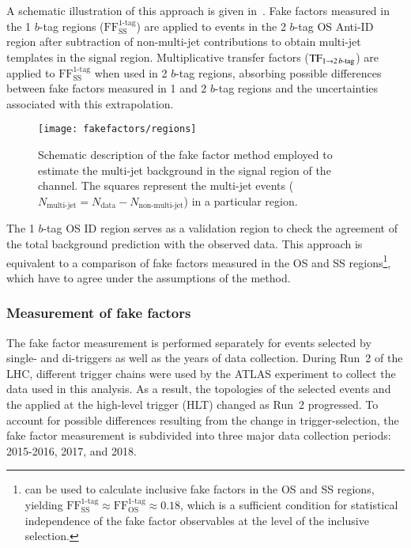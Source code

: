 A schematic illustration of this approach is given
in~. Fake factors measured in the 1
$b$-tag regions ($\text{FF}_\text{SS}^\text{1-tag}$) are applied to
events in the 2 $b$-tag OS Anti-ID region after subtraction of
non-multi-jet contributions to obtain multi-jet templates in the
signal region. Multiplicative transfer factors
($\text{TF}_{1 \rightarrow 2\,b\text{-tag}}$) are applied to
$\text{FF}_\text{SS}^\text{1-tag}$ when used in 2 $b$-tag regions,
absorbing possible differences between fake factors measured in 1 and
2 $b$-tag regions and the uncertainties associated with this
extrapolation.

\begin{figure}[htbp]
  \centering

  \texttt{[image: fakefactors/regions]}

  \caption{Schematic description of the fake factor method employed to
    estimate the multi-jet background in the signal region of the
    \hadhad channel. The squares represent the multi-jet events
    ($N_\text{multi-jet} = N_\text{data} - N_\text{non-multi-jet}$) in
    a particular region.}
  \label{fig:fakefactor_regions}
\end{figure}

The 1 $b$-tag OS ID region serves as a validation region to check the
agreement of the total background prediction with the observed data.
This approach is equivalent to a comparison of fake factors measured in the OS
and SS regions\footnote{ can be used to
  calculate inclusive fake factors in the OS and SS regions, yielding
  $\text{FF}_\text{SS}^\text{1-tag} \approx
  \text{FF}_\text{OS}^\text{1-tag} \approx 0.18$, which is a
  sufficient condition for statistical independence of the fake factor
  observables at the level of the inclusive selection.}, which have to
agree under the assumptions of the method.


\subsubsection{Measurement of fake factors}

The fake factor measurement is performed separately for events
selected by single- and di-\tauhadvis triggers as well as the years of
data collection. During Run~2 of the LHC, different \tauhadvis trigger
chains were used by the ATLAS experiment to collect the data used in
this analysis. As a result, the topologies of the selected events and
the \tauid applied at the high-level trigger (HLT) changed as Run~2
progressed. To account for possible differences resulting from the
change in trigger-selection, the fake factor measurement is subdivided
into three major data collection periods: 2015-2016, 2017, and
2018. %

